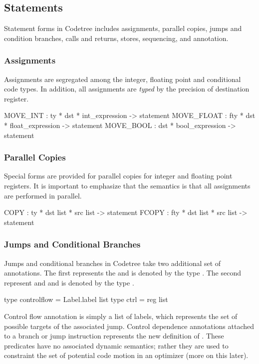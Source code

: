 \subsection{Statements}

Statement forms in Codetree includes assignments, parallel copies,
jumps and condition branches, calls and returns, stores, sequencing,
and annotation.

\subsubsection{Assignments}

Assignments are segregated among the integer, floating point and
conditional code types.  In addition, all assignments are \emph{typed}
by the precision of destination register.

\begin{SML}
   MOVE_INT   : ty * dst * int_expression -> statement
   MOVE_FLOAT  : fty * dst * float_expression -> statement
   MOVE_BOOL : dst * bool_expression -> statement
\end{SML}  

\subsubsection{Parallel Copies}

Special forms are provided for parallel copies for integer and
floating point registers.  It is important to emphasize that
the semantics is that all assignments are performed in parallel.

\begin{SML}
   COPY  : ty * dst list * src list -> statement
   FCOPY : fty * dst list * src list -> statement
\end{SML}

\subsubsection{Jumps and Conditional Branches}  

Jumps and conditional branches in Codetree take two additional set of
annotations.  The first represents the  and is denoted
by the type .  The second represent 
 and  
and is denoted by the type .

\begin{SML}
   type controlflow = Label.label list
   type ctrl = reg list
\end{SML}
Control flow annotation is simply a list of labels, which represents
the set of possible targets of the associated jump.  Control dependence
annotations attached to a branch or jump instruction represents the
new definition of .  These
predicates have no associated dynamic semantics; rather they are used
to constraint the set of potential code motion in an optimizer
(more on this later).

